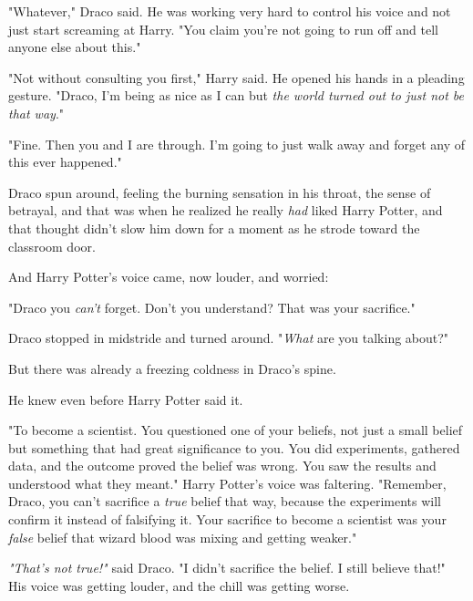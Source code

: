 "Whatever," Draco said. He was working very hard to control his voice and not
just start screaming at Harry. "You claim you're not going to run off and tell
anyone else about this."

"Not without consulting you first," Harry said. He opened his hands in a
pleading gesture. "Draco, I'm being as nice as I can but \emph{the world turned
out to just not be that way}."

"Fine. Then you and I are through. I'm going to just walk away and forget any
of this ever happened."

Draco spun around, feeling the burning sensation in his throat, the sense of
betrayal, and that was when he realized he really \emph{had} liked Harry
Potter, and that thought didn't slow him down for a moment as he strode toward
the classroom door.

And Harry Potter's voice came, now louder, and worried:

"Draco{\el} you \emph{can't} forget. Don't you understand? That was your
sacrifice."

Draco stopped in midstride and turned around. "\emph{What} are you talking
about?"

But there was already a freezing coldness in Draco's spine.

He knew even before Harry Potter said it.

"To become a scientist. You questioned one of your beliefs, not just a small
belief but something that had great significance to you. You did experiments,
gathered data, and the outcome proved the belief was wrong. You saw the results
and understood what they meant." Harry Potter's voice was faltering. "Remember,
Draco, you can't sacrifice a \emph{true} belief that way, because the
experiments will confirm it instead of falsifying it. Your sacrifice to become
a scientist was your \emph{false} belief that wizard blood was mixing and
getting weaker."

\emph{"That's not true!"} said Draco. "I didn't sacrifice the belief. I still
believe that!" His voice was getting louder, and the chill was getting worse.

